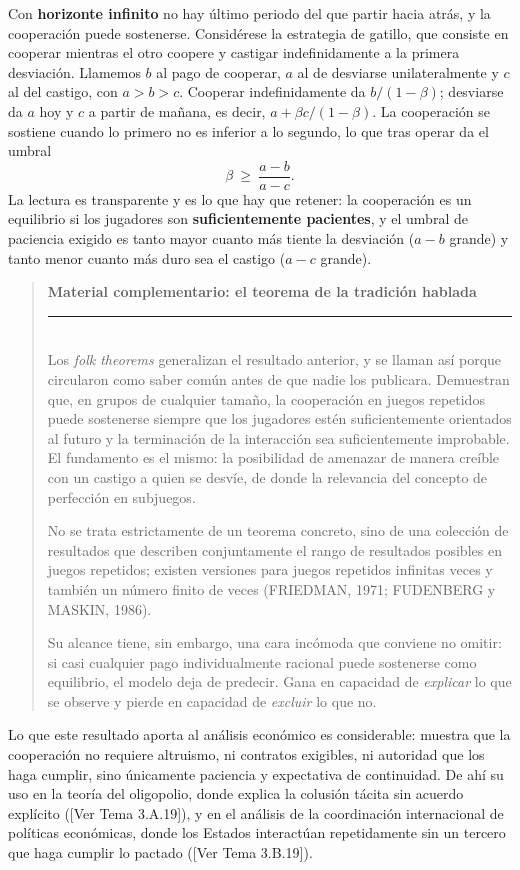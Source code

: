 \documentclass[10pt,a4paper]{article}
\newenvironment{specialblock}[1]{%
      \begin{quote} %
      \small %
      \noindent\textbf{#1}\\[-0.3em] %
      \rule{\linewidth}{0.4pt}\\[0.6em]}{
      \end{quote}}
\newcommand{\authorfont}[1]{{\fontfamily{EBGaramond-TLF}\selectfont #1}}
\begin{document}
Con \textbf{horizonte infinito} no hay último periodo del que partir hacia atrás, y la cooperación puede sostenerse. Considérese la estrategia de gatillo, que consiste en cooperar mientras el otro coopere y castigar indefinidamente a la primera desviación. Llamemos $b$ al pago de cooperar, $a$ al de desviarse unilateralmente y $c$ al del castigo, con $a>b>c$. Cooperar indefinidamente da $b/(1-\beta)$; desviarse da $a$ hoy y $c$ a partir de mañana, es decir, $a+\beta c/(1-\beta)$. La cooperación se sostiene cuando lo primero no es inferior a lo segundo, lo que tras operar da el umbral
$$\beta\ \ge\ \frac{a-b}{a-c}.$$
La lectura es transparente y es lo que hay que retener: la cooperación es un equilibrio si los jugadores son \textbf{suficientemente pacientes}, y el umbral de paciencia exigido es tanto mayor cuanto más tiente la desviación ($a-b$ grande) y tanto menor cuanto más duro sea el castigo ($a-c$ grande).

\begin{specialblock}{\textbf{Material complementario:} el teorema de la tradición hablada}
    Los \textit{folk theorems} generalizan el resultado anterior, y se llaman así porque circularon como saber común antes de que nadie los publicara. Demuestran que, en grupos de cualquier tamaño, la cooperación en juegos repetidos puede sostenerse siempre que los jugadores estén suficientemente orientados al futuro y la terminación de la interacción sea suficientemente improbable. El fundamento es el mismo: la posibilidad de amenazar de manera creíble con un castigo a quien se desvíe, de donde la relevancia del concepto de perfección en subjuegos.

    No se trata estrictamente de un teorema concreto, sino de una colección de resultados que describen conjuntamente el rango de resultados posibles en juegos repetidos; existen versiones para juegos repetidos infinitas veces y también un número finito de veces (FRIEDMAN, 1971; FUDENBERG y MASKIN, 1986).

    Su alcance tiene, sin embargo, una cara incómoda que conviene no omitir: si casi cualquier pago individualmente racional puede sostenerse como equilibrio, el modelo deja de predecir. Gana en capacidad de \textit{explicar} lo que se observe y pierde en capacidad de \textit{excluir} lo que no.
\end{specialblock}

Lo que este resultado aporta al análisis económico es considerable: muestra que la cooperación no requiere altruismo, ni contratos exigibles, ni autoridad que los haga cumplir, sino únicamente paciencia y expectativa de continuidad. De ahí su uso en la teoría del oligopolio, donde explica la colusión tácita sin acuerdo explícito ([\authorfont{Ver Tema 3.A.19}]), y en el análisis de la coordinación internacional de políticas económicas, donde los Estados interactúan repetidamente sin un tercero que haga cumplir lo pactado ([\authorfont{Ver Tema 3.B.19}]).
\end{document}
